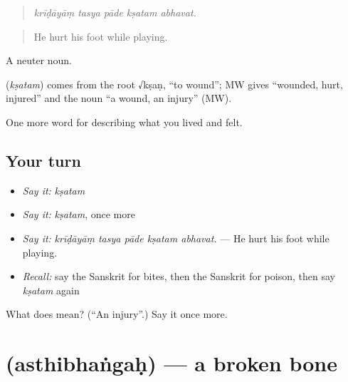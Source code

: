 \begin{quote}
    
\end{quote}

\begin{quote}
\emph{krīḍāyāṃ tasya pāde kṣatam abhavat.}
\end{quote}

\begin{quote}
He hurt his foot while playing.
\end{quote}

A neuter noun.

\begin{cousinweb}
\textbf{} (\emph{kṣatam}) comes from the root √kṣaṇ, \textquotedblleft{}to wound\textquotedblright{}; MW gives \textquotedblleft{}wounded, hurt, injured\textquotedblright{} and the noun \textquotedblleft{}a wound, an injury\textquotedblright{} (MW).
\end{cousinweb}

\begin{grammarlens}[title={What you've built}]
One more word for describing what you lived and felt.
\end{grammarlens}

\subsection*{Your turn}
\begin{itemize}
\raggedright
  \item \emph{Say it:} \emph{kṣatam}
  \item \emph{Say it:} \emph{kṣatam}, once more
  \item \emph{Say it:} \emph{krīḍāyāṃ tasya pāde kṣatam abhavat.} — He hurt his foot while playing.
  \item \emph{Recall:} say the Sanskrit for bites, then the Sanskrit for poison, then say \emph{kṣatam} again
\end{itemize}

\begin{tcolorbox}[breakable,colback=teal!4,colframe=teal!35!black,title={Before you move on}]
What does  mean? (\textquotedblleft{}An injury\textquotedblright{}.) Say it once more.
\end{tcolorbox}
\section[\texorpdfstring{\sk{अस्थिभंगः} (asthibhaṅgaḥ)}{अस्थिभंगः (asthibhaṅgaḥ)}]{ (asthibhaṅgaḥ) — a broken bone}

